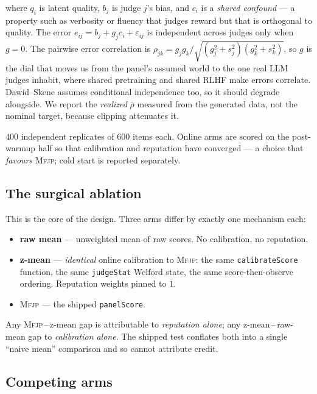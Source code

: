 \documentclass[11pt]{article}
\theoremstyle{definition}
\newcommand{\rhobar}{\ensuremath{\bar{\rho}}}
\newcommand{\mfjp}{\textsc{Mfjp}}
\begin{document}
where $q_i$ is latent quality, $b_j$ is judge $j$'s bias, and $c_i$ is a \emph{shared
confound} --- a property such as verbosity or fluency that judges reward but that is
orthogonal to quality. The error $e_{ij}=b_j+g_jc_i+\varepsilon_{ij}$ is independent across
judges only when $g=0$. The pairwise error correlation is
$\rho_{jk} = g_jg_k/\sqrt{(g_j^2+s_j^2)(g_k^2+s_k^2)}$, so $g$ is the dial that moves us from
the panel's assumed world to the one real LLM judges inhabit, where shared pretraining and
shared RLHF make errors correlate. Dawid--Skene assumes conditional independence too, so it
should degrade alongside. We report the \emph{realized} \rhobar{} measured from the generated
data, not the nominal target, because clipping attenuates it.

$400$ independent replicates of $600$ items each. Online arms are scored on the post-warmup
half so that calibration and reputation have converged --- a choice that \emph{favours}
\mfjp{}; cold start is reported separately.

\subsection{The surgical ablation}

This is the core of the design. Three arms differ by exactly one mechanism each:

\begin{itemize}[nosep]
\item \textbf{raw mean} --- unweighted mean of raw scores. No calibration, no reputation.
\item \textbf{z-mean} --- \emph{identical} online calibration to \mfjp{}: the same
\texttt{calibrateScore} function, the same \texttt{judgeStat} Welford state, the same
score-then-observe ordering. Reputation weights pinned to $1$.
\item \mfjp{} --- the shipped \texttt{panelScore}.
\end{itemize}

Any \mfjp{}\,--\,z-mean gap is attributable to \emph{reputation alone}; any z-mean\,--\,raw-mean
gap to \emph{calibration alone}. The shipped test conflates both into a single ``naive mean''
comparison and so cannot attribute credit.

\subsection{Competing arms}
\end{document}
